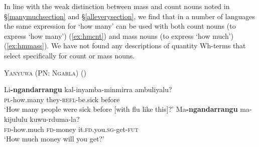 \documentclass[12pt,egregdoesnotlikesansseriftitles]{scrartcl}
\begin{document}
In line with the weak distinction between mass and count nouns noted in \S\ref{manymuchsection} and \S\ref{alleverysection}, we find that in a number of languages the same expression for `how many' can be used with both count nouns (to express `how many')  (\ref{ex:hmcnt}) and  mass nouns (to express `how much')  (\ref{ex:hmmass}). We have not found any descriptions of quantity Wh-terms that select specifically for count or mass nouns. 
\begin{exe}
  \ex \textsc{Yanyuwa (PN: Ngarla)} \hfill (\citealt[27]{kc96})
  \begin{xlist}
    \ex \gll Li\textbf{-ngandarrangu} kal-inyamba-minmirra ambuliyalu? \\
    \textsc{pl}-how.many     they-\textsc{refl}-be.sick       before\\
    \glt `How many people were sick before [with flu like this]?' \label{ex:hmcnt}
    \ex \gll Ma\textbf{-ngandarrangu} ma-kijululu kuwu-rduma-la? \\
    \textsc{fd}-how.much       \textsc{fd}-money it.\textsc{fd}.you.\textsc{sg}-get-\textsc{fut} \\
    \glt `How much money will you get?' \label{ex:hmmass}
  \end{xlist}
  
  

\end{exe}
\end{document}

